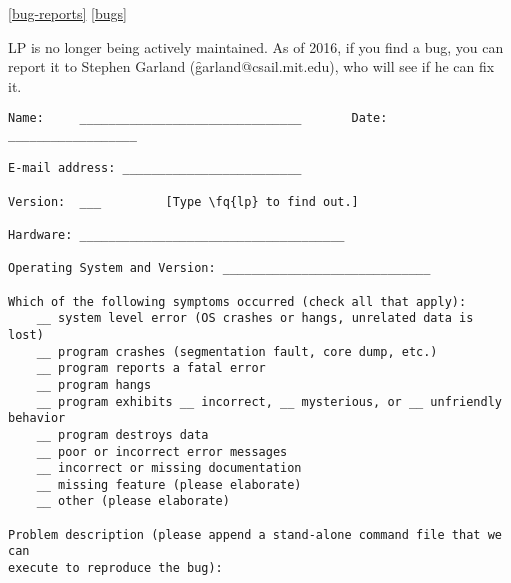\ref{bug-reports}
\ref{bugs}

LP is no longer being actively maintained.  As of 2016, if you find a bug, you
can report it to Stephen Garland (\f{garland@csail.mit.edu}), who will see if he
can fix it.

\begin{verbatim}
Name:     _______________________________       Date: __________________

E-mail address: _________________________

Version:  ___         [Type \fq{lp} to find out.]

Hardware: _____________________________________

Operating System and Version: _____________________________

Which of the following symptoms occurred (check all that apply):
    __ system level error (OS crashes or hangs, unrelated data is lost)
    __ program crashes (segmentation fault, core dump, etc.)
    __ program reports a fatal error
    __ program hangs
    __ program exhibits __ incorrect, __ mysterious, or __ unfriendly behavior
    __ program destroys data
    __ poor or incorrect error messages
    __ incorrect or missing documentation
    __ missing feature (please elaborate)
    __ other (please elaborate)

Problem description (please append a stand-alone command file that we can
execute to reproduce the bug):
\end{verbatim}

